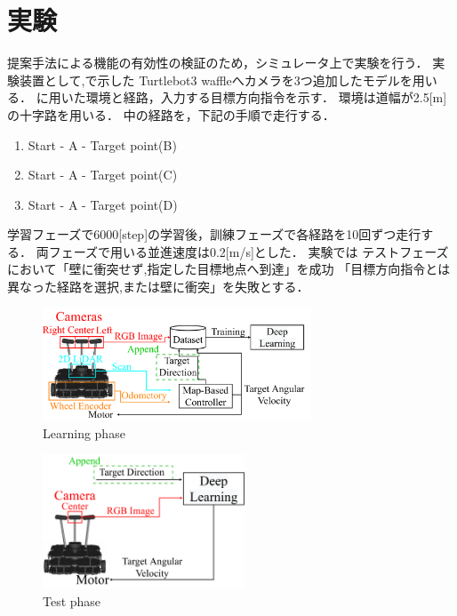 \documentclass[10pt]{jarticle}
\begin{document}
    \section{実\hspace{2zw}験}%
    提案手法による機能の有効性の検証のため，シミュレータ上で実験を行う．
    実験装置として,で示した
    Turtlebot3 waffleへカメラを3つ追加したモデルを用いる．
    に用いた環境と経路，入力する目標方向指令を示す．
    環境は道幅が2.5[m]の十字路を用いる．
    中の経路を，下記の手順で走行する．
    \begin{enumerate}
        \setlength{\parskip}{0cm} %
        \setlength{\itemsep}{0cm} %
        \item Start - A - Target point(B)
        \item Start - A - Target point(C)
        \item Start - A - Target point(D)
        \end{enumerate}
        学習フェーズで6000[step]の学習後，訓練フェーズで各経路を10回ずつ走行する．
        両フェーズで用いる並進速度は0.2[m/s]とした．
    実験では
    テストフェーズにおいて「壁に衝突せず,指定した目標地点へ到達」を成功
    「目標方向指令とは異なった経路を選択,または壁に衝突」を失敗とする．
    \begin{center}
        \begin{figure}[t]
            \centering
            \includegraphics[width=8cm]{./fig/system_learning_app.pdf}
            \caption{Learning phase}
            \label{fig:system_learning}
        \end{figure}
    \end{center}
    \begin{center}
        \begin{figure}[t]
            \centering
            \includegraphics[width=6cm]{./fig/system_test_app.pdf}
            \caption{Test phase}
            \label{fig:system_test}
        \end{figure}
    \end{center}
\end{document}
